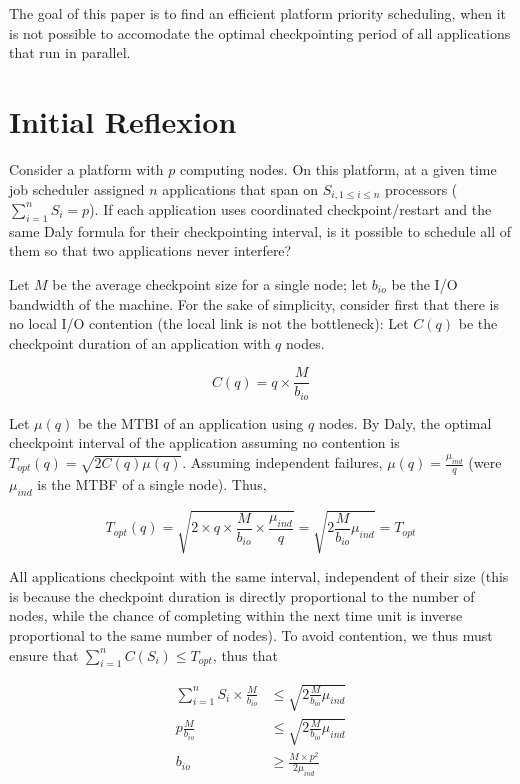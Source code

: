 \documentclass{article}
\begin{document}
The goal of this paper is to find an efficient platform priority scheduling, when it is not possible to accomodate the optimal checkpointing period of all applications that run in parallel.

\pagebreak

\appendix
\section{Initial Reflexion}

Consider a platform with $p$ computing nodes. On this platform, at a given time job scheduler assigned $n$ applications that span on $S_{i, 1 \leq i \leq n}$ processors ($\sum_{i=1}^{n}S_i = p$). If each application uses coordinated checkpoint/restart and the same Daly formula for their checkpointing interval, is it possible to schedule all of them so that two applications never interfere?

Let $M$ be the average checkpoint size for a single node; let $b_{io}$ be the I/O bandwidth of the machine. For the sake of simplicity, consider first that there is no local I/O contention (the local link is not the bottleneck): Let $C(q)$ be the checkpoint duration of an application with $q$ nodes.

$$C(q) = q\times \frac{M}{b_{io}}$$

Let $\mu(q)$ be the MTBI of an application using $q$ nodes. By Daly, the optimal checkpoint interval of the application assuming no contention is $T_{opt}(q) = \sqrt{2C(q)\mu(q)}$. Assuming independent failures, $\mu(q) = \frac{\mu_{ind}}{q}$ (were $\mu_{ind}$ is the MTBF of a single node). Thus,

$$T_{opt}(q) = \sqrt{2\times q\times \frac{M}{b_{io}} \times \frac{\mu_{ind}}{q}} = \sqrt{2\frac{M}{b_{io}}\mu_{ind}} = T_{opt}$$

All applications checkpoint with the same interval, independent of their size (this is because the checkpoint duration is directly proportional to the number of nodes, while the chance of completing within the next time unit is inverse proportional to the same number of nodes).  To avoid contention, we thus must ensure that $\sum_{i = 1}^{n} C(S_i) \leq T_{opt}$, thus that

$$\begin{array}{rl}
\sum_{i = 1}^{n} S_i\times \frac{M}{b_{io}} & \leq \sqrt{2\frac{M}{b_{io}}\mu_{ind}}\\
p\frac{M}{b_{io}} & \leq \sqrt{2\frac{M}{b_{io}}\mu_{ind}}\\
b_{io} & \geq \frac{M\times p^2}{2\mu_{ind}}
\end{array}$$
\end{document}
